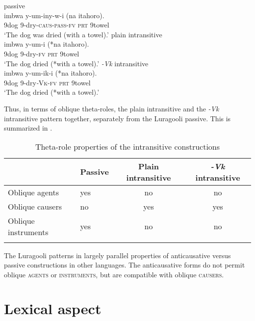 \documentclass[output=paper]{langsci/langscibook}
\begin{document}
\ea\label{ex:gluckman:9}
  \ea \label{ex:gluckman:9a} 
  {{passive}}\\
  \gll imbwa y-um-iny-w-i            (na    itahoro).\\
      9dog 9-dry-\textsc{caus}-\textsc{pass}-\textsc{fv}   \textsc{prt}  9towel\\
  \glt ‘The dog was dried (with a towel).’
  \ex\label{ex:gluckman:9b} 
  {{plain intransitive}}\\
  \gll imbwa y-um-i          (*na   itahoro).\\
      9dog   9-dry-\textsc{fv}         \hphantom{(*}\textsc{prt} 9towel\\
  \glt ‘The dog dried (*with a towel).’
  \ex\label{ex:gluckman:9c}
  {{\textit{-Vk}}{ intransitive}}\\
  \gll imbwa  y-um-ik-i      (*na  itahoro).\\
      9dog    9-dry\textit{-}\textsc{Vk}-\textsc{fv} \hphantom{(*}\textsc{prt} 9towel\\
  \glt ‘The dog dried (*with a towel).’
  \z
\z

Thus, in terms of oblique theta-roles, the plain intransitive and the \textit{-Vk} intransitive pattern together, separately from the Luragooli passive. This is summarized in .

\begin{table}
\caption{Theta-role properties of the intransitive constructions}
\label{tab:gluckman:2}

\begin{tabularx}{\textwidth}{llCC}
\lsptoprule
 & {Passive} & {Plain intransitive} & {\textit{-Vk}} {intransitive}\\
\midrule
{Oblique agents} & yes & no & no\\
{Oblique causers} & no & yes & yes\\
{Oblique instruments} & yes & no & no\\
\lspbottomrule
\end{tabularx}
\end{table}

The Luragooli patterns in  largely parallel properties of anticausative versus passive constructions in other languages. The anticausative forms do not permit oblique \textsc{agents} or \textsc{instruments}, but are compatible with oblique \textsc{causers.}

\section{Lexical aspect}\label{sec:gluckman:4}
\end{document}
